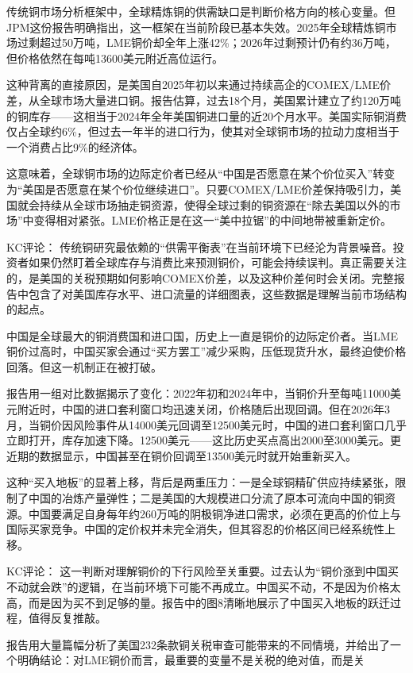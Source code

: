 \documentclass[11pt]{ctexart}
\begin{document}
传统铜市场分析框架中，全球精炼铜的供需缺口是判断价格方向的核心变量。但JPM这份报告明确指出，这一框架在当前阶段已基本失效。2025年全球精炼铜市场过剩超过50万吨，LME铜价却全年上涨42\%；2026年过剩预计仍有约36万吨，但价格依然在每吨13600美元附近高位运行。

这种背离的直接原因，是美国自2025年初以来通过持续高企的COMEX/LME价差，从全球市场大量进口铜。报告估算，过去18个月，美国累计建立了约120万吨的铜库存——这相当于2024年全年美国铜进口量的近20个月水平。美国实际铜消费仅占全球约6\%，但过去一年半的进口行为，使其对全球铜市场的拉动力度相当于一个消费占比9\%的经济体。

这意味着，全球铜市场的边际定价者已经从“中国是否愿意在某个价位买入”转变为“美国是否愿意在某个价位继续进口”。只要COMEX/LME价差保持吸引力，美国就会持续从全球市场抽走铜资源，使得全球过剩的铜资源在“除去美国以外的市场”中变得相对紧张。LME价格正是在这一“美中拉锯”的中间地带被重新定价。

KC评论： 传统铜研究最依赖的“供需平衡表”在当前环境下已经沦为背景噪音。投资者如果仍然盯着全球库存与消费比来预测铜价，可能会持续误判。真正需要关注的，是美国的关税预期如何影响COMEX价差，以及这种价差何时会关闭。完整报告中包含了对美国库存水平、进口流量的详细图表，这些数据是理解当前市场结构的起点。

中国是全球最大的铜消费国和进口国，历史上一直是铜价的边际定价者。当LME铜价过高时，中国买家会通过“买方罢工”减少采购，压低现货升水，最终迫使价格回落。但这一机制正在被打破。

报告用一组对比数据揭示了变化：2022年初和2024年中，当铜价升至每吨11000美元附近时，中国的进口套利窗口均迅速关闭，价格随后出现回调。但在2026年3月，当铜价因风险事件从14000美元回调至12500美元时，中国的进口套利窗口几乎立即打开，库存加速下降。12500美元——这比历史买点高出2000至3000美元。更近期的数据显示，中国甚至在铜价回调至13500美元时就开始重新买入。

这种“买入地板”的显著上移，背后是两重压力：一是全球铜精矿供应持续紧张，限制了中国的冶炼产量弹性；二是美国的大规模进口分流了原本可流向中国的铜资源。中国要满足自身每年约260万吨的阴极铜净进口需求，必须在更高的价位上与国际买家竞争。中国的定价权并未完全消失，但其容忍的价格区间已经系统性上移。

KC评论： 这一判断对理解铜价的下行风险至关重要。过去认为“铜价涨到中国买不动就会跌”的逻辑，在当前环境下可能不再成立。中国买不动，不是因为价格太高，而是因为买不到足够的量。报告中的图8清晰地展示了中国买入地板的跃迁过程，值得反复推敲。

报告用大量篇幅分析了美国232条款铜关税审查可能带来的不同情境，并给出了一个明确结论：对LME铜价而言，最重要的变量不是关税的绝对值，而是关
\end{document}
